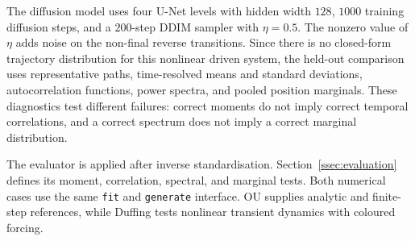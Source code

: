 The diffusion model uses four U-Net levels with hidden width $128$, $1000$
training diffusion steps, and a $200$-step DDIM sampler with $\eta=0.5$.
The nonzero value of $\eta$ adds noise on the non-final reverse transitions. Since
there is no closed-form trajectory distribution for this nonlinear driven system,
the held-out comparison uses representative paths, time-resolved means and
standard deviations, autocorrelation functions, power spectra, and pooled
position marginals. These diagnostics test different failures: correct moments do
not imply correct temporal correlations, and a correct spectrum does not imply a
correct marginal distribution.

The evaluator is applied after inverse standardisation. Section~\ref{ssec:evaluation}
defines its moment, correlation, spectral, and marginal tests. Both numerical cases
use the same \texttt{fit} and \texttt{generate} interface. OU supplies analytic
and finite-step references, while Duffing tests nonlinear transient dynamics with
coloured forcing.
